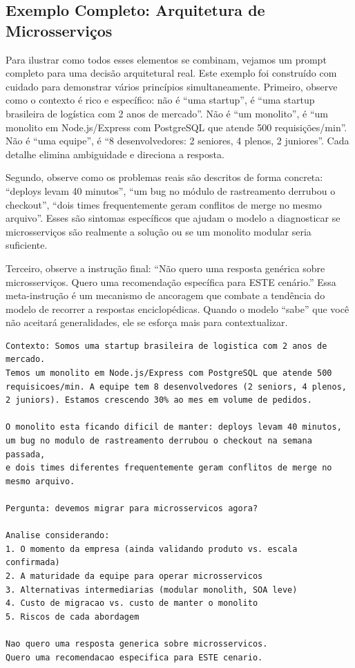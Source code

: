 \subsection{Exemplo Completo: Arquitetura de Microsserviços}

Para ilustrar como todos esses elementos se combinam, vejamos um
prompt completo para uma decisão arquitetural real. Este exemplo foi construído
com cuidado para demonstrar vários princípios simultaneamente. Primeiro, observe
como o contexto é rico e específico: não é ``uma startup'', é ``uma startup
brasileira de logística com 2 anos de mercado''. Não é ``um monolito'', é ``um
monolito em Node.js/Express com PostgreSQL que atende 500 requisições/min''. Não
é ``uma equipe'', é ``8 desenvolvedores: 2 seniores, 4 plenos, 2 juniores''.
Cada detalhe elimina ambiguidade e direciona a resposta.

Segundo, observe como os problemas reais são descritos de forma concreta: ``deploys
levam 40 minutos'', ``um bug no módulo de rastreamento derrubou o checkout'',
``dois times frequentemente geram conflitos de merge no mesmo arquivo''. Esses
são sintomas específicos que ajudam o modelo a
diagnosticar se microsserviços são realmente a solução ou se um monolito modular
seria suficiente.

Terceiro, observe a instrução final: ``Não quero uma resposta genérica sobre
microsserviços. Quero uma recomendação específica para ESTE cenário.'' Essa
meta-instrução é um mecanismo de ancoragem que combate a tendência do modelo de
recorrer a respostas enciclopédicas. Quando o modelo ``sabe'' que você não
aceitará generalidades, ele se esforça mais para contextualizar.

\begin{lstlisting}[language={}, caption={Prompt completo para decisão de arquitetura}]
Contexto: Somos uma startup brasileira de logistica com 2 anos de mercado.
Temos um monolito em Node.js/Express com PostgreSQL que atende 500
requisicoes/min. A equipe tem 8 desenvolvedores (2 seniors, 4 plenos,
2 juniors). Estamos crescendo 30% ao mes em volume de pedidos.

O monolito esta ficando dificil de manter: deploys levam 40 minutos,
um bug no modulo de rastreamento derrubou o checkout na semana passada,
e dois times diferentes frequentemente geram conflitos de merge no
mesmo arquivo.

Pergunta: devemos migrar para microsservicos agora?

Analise considerando:
1. O momento da empresa (ainda validando produto vs. escala confirmada)
2. A maturidade da equipe para operar microsservicos
3. Alternativas intermediarias (modular monolith, SOA leve)
4. Custo de migracao vs. custo de manter o monolito
5. Riscos de cada abordagem

Nao quero uma resposta generica sobre microsservicos.
Quero uma recomendacao especifica para ESTE cenario.
\end{lstlisting}

